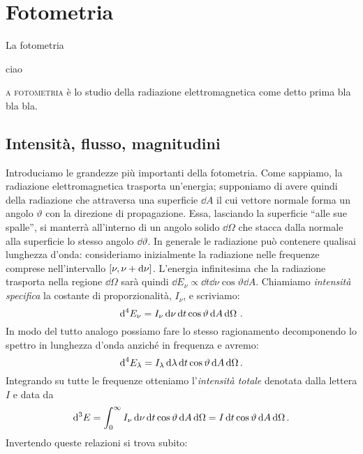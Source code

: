 \chapter{Fotometria}\label{ch:fotometria}
\epigraph{La fotometria}{ciao}
\noindent{}\textsc{a fotometria} è lo studio della radiazione elettromagnetica come detto prima bla bla bla. \lipsum[1]
\section{Intensità, flusso, magnitudini}
    Introduciamo le grandezze più importanti della fotometria. Come sappiamo, la radiazione elettromagnetica trasporta un'energia; supponiamo di avere quindi della radiazione che attraversa una superficie $\dd A$ il cui vettore normale forma un angolo $\vartheta$ con la direzione di propagazione. Essa, lasciando la superficie ``alle sue spalle'', si manterrà all'interno di un angolo solido $\dd\Omega$ che stacca dalla normale alla superficie lo stesso angolo $\dd\vartheta$. In generale le radiazione può contenere qualisai lunghezza d'onda: consideriamo inizialmente la radiazione nelle frequenze comprese nell'intervallo  $\bqty{\nu,\nu + \dd\nu}$. L'energia infinitesima che la radiazione trasporta nella regione $\dd\Omega$ sarà quindi $\dd E_\nu \propto \dd t \dd\nu \cos\vartheta\dd A$. Chiamiamo \emph{intensità specifica} la costante di proporzionalità, $I_\nu$, e scriviamo:
    \begin{equation}
        \label{intensità-specifica-freq}
        \dd[4] E_\nu = I_{\nu} \dd{\nu} \dd{t} \cos{\vartheta} \dd{A} \dd{\Omega}
        \,.
    \end{equation}
    In modo del tutto analogo possiamo fare lo stesso ragionamento decomponendo lo spettro in lunghezza d'onda anziché in frequenza e avremo:
    \begin{equation}
        \label{intensità-specifica-lambda}
        \dd[4] E_\lambda = I_\lambda \,\dd\lambda\,\dd t\cos\vartheta\,\dd A \,\dd\Omega
        \,.
    \end{equation}
    Integrando su tutte le frequenze otteniamo l'\emph{intensità totale} denotata dalla lettera $I$ e data da
    \begin{equation*}
        \label{intensità-totale}
        \dd[3] E = \int_{0}^{\infty}I_\nu \,\dd\nu\,\dd t\cos\vartheta\,\dd A \,\dd\Omega = I \,\dd t\cos\vartheta\,\dd A \,\dd\Omega
        \,.
    \end{equation*}
    Invertendo queste relazioni si trova subito:
